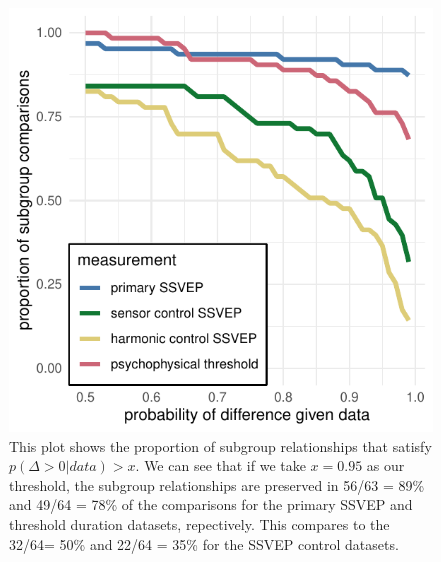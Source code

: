 \documentclass[9pt,twocolumn,twoside,lineno]{pnas-new}
\begin{document}
\begin{figure}[tbp]
\centering
\includegraphics[width=1\linewidth]{../analysis/plots/model_roc_style.pdf}
\caption{This plot shows the proportion of subgroup relationships that satisfy $p(\Delta >0 | data) > x$. We can see that if we take $x = 0.95$ as our threshold, the subgroup relationships are preserved in 56/63 = 89\% and 49/64 = 78\% of the comparisons for the primary SSVEP and threshold duration datasets, repectively. This compares to the 32/64= 50\% and 22/64 = 35\% for the SSVEP control datasets.}
\label{fig:durations_rotations}
\end{figure}



\end{document}
